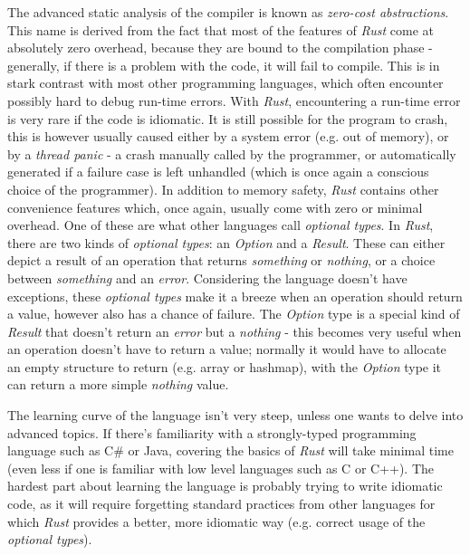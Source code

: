         The advanced static analysis of the compiler is known as \textit{zero-cost abstractions}. This name is derived from the fact that most of the features of \textit{Rust} come at absolutely zero overhead, because they are bound to the compilation phase - generally, if there is a problem with the code, it will fail to compile. This is in stark contrast with most other programming languages, which often encounter possibly hard to debug run-time errors. With \textit{Rust}, encountering a run-time error is very rare if the code is idiomatic. It is still possible for the program to crash, this is however usually caused either by a system error (e.g. out of memory), or by a \textit{thread panic} - a crash manually called by the programmer, or automatically generated if a failure case is left unhandled (which is once again a conscious choice of the programmer). In addition to memory safety, \textit{Rust} contains other convenience features which, once again, usually come with zero or minimal overhead. One of these are what other languages call \textit{optional types}. In \textit{Rust}, there are two kinds of \textit{optional types}: an \textit{Option} and a \textit{Result}. These can either depict a result of an operation that returns \textit{something} or \textit{nothing}, or a choice between \textit{something} and an \textit{error}. Considering the language doesn't have exceptions, these \textit{optional types} make it a breeze when an operation should return a value, however also has a chance of failure. The \textit{Option} type is a special kind of \textit{Result} that doesn't return an \textit{error} but a \textit{nothing} - this becomes very useful when an operation doesn't have to return a value; normally it would have to allocate an empty structure to return (e.g. array or hashmap), with the \textit{Option} type it can return a more simple \textit{nothing} value.
        
        The learning curve of the language isn't very steep, unless one wants to delve into advanced topics. If there's familiarity with a strongly-typed programming language such as C\# or Java, covering the basics of \textit{Rust} will take minimal time (even less if one is familiar with low level languages such as C or C++). The hardest part about learning the language is probably trying to write idiomatic code, as it will require forgetting standard practices from other languages for which \textit{Rust} provides a better, more idiomatic way (e.g. correct usage of the \textit{optional types}).
        
